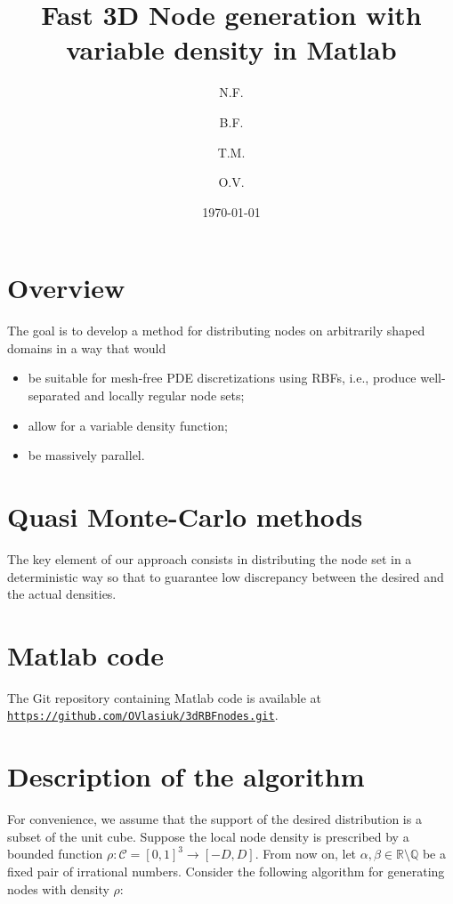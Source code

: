 \documentclass[10pt]{amsart}
\title{Fast 3D Node generation with variable density in Matlab}
\author{N.F.}
\author{B.F.}
\author{T.M.}
\author{O.V.}
\date{\today}
\begin{document}
\maketitle

\section{Overview}

The goal is to develop a method for distributing nodes on arbitrarily shaped domains in a way that would 
\begin{itemize}
 \item be suitable for mesh-free PDE discretizations using RBFs, i.e., produce well-separated and locally regular node sets;
 \item allow for a variable density function;
 \item be massively parallel.
\end{itemize}

\section{Quasi Monte-Carlo methods}

The key element of our approach consists in distributing the node set in a deterministic way so that to guarantee low discrepancy between the desired and the actual densities.



\section{Matlab code}

The Git repository containing Matlab code is available at  \texttt{\url{https://github.com/OVlasiuk/3dRBFnodes.git}}.

\section{Description of the algorithm}

For convenience, we assume that the support of the desired distribution is a subset of the unit cube. Suppose the local node density is prescribed by a bounded function $\rho: \mathcal{C} =[0,1]^3 \to [-D,D]$. From now on, let $ \alpha, \beta\in\mathbb{R}\setminus\mathbb{Q} $ be a fixed pair of irrational numbers. Consider the following algorithm for generating nodes with density $ \rho $:  
\end{document}

